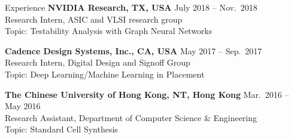 
\begin{rSection}{Experience}
{\bf NVIDIA Research, TX, USA}               \hfill { July 2018 -- Nov.~2018} \\
Research Intern, ASIC and VLSI research group\\
Topic: Testability Analysis with Graph Neural Networks

{\bf Cadence Design Systems, Inc., CA, USA}               \hfill { May 2017 -- Sep.~2017} \\
Research Intern, Digital Design and Signoff Group\\
Topic: Deep Learning/Machine Learning in Placement

{\bf The Chinese University of Hong Kong, NT, Hong Kong}  \hfill { Mar.~2016 -- May 2016} \\ 
Research Assistant, Department of Computer Science \& Engineering \\
Topic: Standard Cell Synthesis

\end{rSection}



